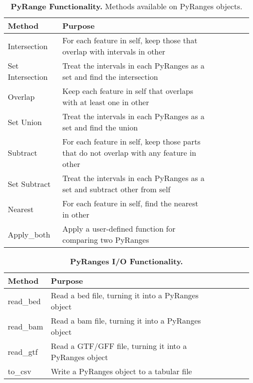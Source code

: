 \documentclass[10pt,letterpaper]{article}
\begin{document}
\begin{table}[!ht]
\begin{adjustwidth}{-1.5in}{0in}
\centering
\caption{{\bf PyRange Functionality.} Methods available on PyRanges objects.}
\begin{tabular}{|l|l|l|l|l|l|l|}
\hline
  {\bf Method} & {\bf Purpose} \\ \hline
  Intersection & For each feature in self, keep those that overlap with intervals in other \footnotemark \\ \hline
  Set Intersection & Treat the intervals in each PyRanges as a set and find the intersection \footnotemark \\ \hline
  Overlap & Keep each feature in self that overlaps with at least one in other \\ \hline
  Set Union & Treat the intervals in each PyRanges as a set and find the union \\ \hline
  Subtract & For each feature in self, keep those parts that do not overlap with any feature in other \\ \hline
  Set Subtract & Treat the intervals in each PyRanges as a set and subtract other from self \\ \hline
  Nearest & For each feature in self, find the nearest in other \\ \hline
  Apply\_both & Apply a user-defined function for comparing two PyRanges \\ \hline
\end{tabular}
\label{tab2}
\end{adjustwidth}
\end{table}

\begin{table}[!ht]
\begin{adjustwidth}{-1.5in}{0in}
\centering
\caption{{\bf PyRanges I/O Functionality.}}
\begin{tabular}{|l|l|l|l|l|l|l|}
\hline
  {\bf Method} & {\bf Purpose} \\ \hline
  read\_bed & Read a bed file, turning it into a PyRanges object\\ \hline
  read\_bam & Read a bam file, turning it into a PyRanges object\\ \hline
  read\_gtf & Read a GTF/GFF file, turning it into a PyRanges object\\ \hline
  to\_csv & Write a PyRanges object to a tabular file \\ \hline
\end{tabular}
\label{tab3}
\end{adjustwidth}
\end{table}
\end{document}
